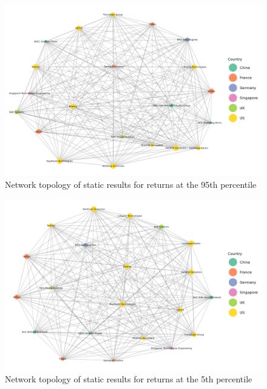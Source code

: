 \documentclass[
  letterpaper,
  DIV=11,
  numbers=noendperiod]{scrartcl}
\begin{document}
\begin{figure}[H]

{\centering \includegraphics[width=6.75in,height=\textheight]{plots/fig-rtn95.png}

}

\caption{\label{fig-rtn95}Network topology of static results for returns
at the 95th percentile}

\end{figure}

\begin{figure}[H]

{\centering \includegraphics[width=6.75in,height=\textheight]{plots/fig-rtn5.png}

}

\caption{\label{fig-rtn5}Network topology of static results for returns
at the 5th percentile}

\end{figure}
\end{document}
